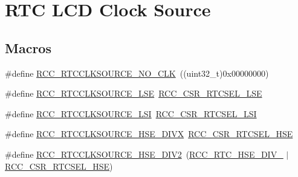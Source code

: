 \hypertarget{group___r_c_c___r_t_c___l_c_d___clock___source}{\section{R\-T\-C L\-C\-D Clock Source}
\label{group___r_c_c___r_t_c___l_c_d___clock___source}
}
\subsection*{Macros}
\begin{DoxyCompactItemize}
\item 
\#define \hyperlink{group___r_c_c___r_t_c___l_c_d___clock___source_gacce0b2f54d103340d8c3a218e86e295d}{R\-C\-C\-\_\-\-R\-T\-C\-C\-L\-K\-S\-O\-U\-R\-C\-E\-\_\-\-N\-O\-\_\-\-C\-L\-K}~((uint32\-\_\-t)0x00000000)
\item 
\#define \hyperlink{group___r_c_c___r_t_c___l_c_d___clock___source_ga5dca8d63f250a20bd6bc005670d0c150}{R\-C\-C\-\_\-\-R\-T\-C\-C\-L\-K\-S\-O\-U\-R\-C\-E\-\_\-\-L\-S\-E}~\hyperlink{group___peripheral___registers___bits___definition_gabaaeebc88a8a5ca1176e32f676a3cc2c}{R\-C\-C\-\_\-\-C\-S\-R\-\_\-\-R\-T\-C\-S\-E\-L\-\_\-\-L\-S\-E}
\item 
\#define \hyperlink{group___r_c_c___r_t_c___l_c_d___clock___source_gab47a1afb8b5eef9f20f4772961d0a5f4}{R\-C\-C\-\_\-\-R\-T\-C\-C\-L\-K\-S\-O\-U\-R\-C\-E\-\_\-\-L\-S\-I}~\hyperlink{group___peripheral___registers___bits___definition_ga5a5da77ab05027820e8c16ad4d7c3f41}{R\-C\-C\-\_\-\-C\-S\-R\-\_\-\-R\-T\-C\-S\-E\-L\-\_\-\-L\-S\-I}
\item 
\#define \hyperlink{group___r_c_c___r_t_c___l_c_d___clock___source_ga2e3715826835647795863c32f9aebad7}{R\-C\-C\-\_\-\-R\-T\-C\-C\-L\-K\-S\-O\-U\-R\-C\-E\-\_\-\-H\-S\-E\-\_\-\-D\-I\-V\-X}~\hyperlink{group___peripheral___registers___bits___definition_ga63cfa8b19f84b2018e49afb4c69a76da}{R\-C\-C\-\_\-\-C\-S\-R\-\_\-\-R\-T\-C\-S\-E\-L\-\_\-\-H\-S\-E}
\item 
\#define \hyperlink{group___r_c_c___r_t_c___l_c_d___clock___source_gac1ee63256acb5637e994abf629edaf3b}{R\-C\-C\-\_\-\-R\-T\-C\-C\-L\-K\-S\-O\-U\-R\-C\-E\-\_\-\-H\-S\-E\-\_\-\-D\-I\-V2}~(\hyperlink{group___r_c_c___h_a_l___e_c___r_t_c___h_s_e___d_i_v_ga1f44740a93ee5b2317052cc78bb2e0ed}{R\-C\-C\-\_\-\-R\-T\-C\-\_\-\-H\-S\-E\-\_\-\-D\-I\-V\-\_}  $\vert$ \hyperlink{group___peripheral___registers___bits___definition_ga63cfa8b19f84b2018e49afb4c69a76da}{R\-C\-C\-\_\-\-C\-S\-R\-\_\-\-R\-T\-C\-S\-E\-L\-\_\-\-H\-S\-E})

\end{DoxyCompactItemize}
